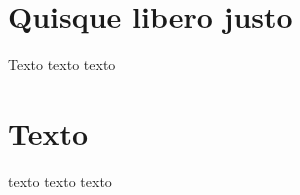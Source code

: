 \begin{apendicesenv}

\partapendices

\chapter{Quisque libero justo}

Texto texto texto

\chapter{Texto}
texto texto texto

\end{apendicesenv}
